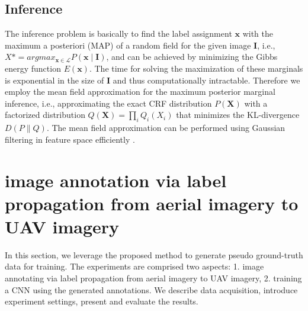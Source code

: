 \subsection{Inference}
\label{method:infer}
The inference problem is basically to find the label assignment $\mathbf{x}$ with the maximum a posteriori (MAP) of a random field for the given image $\mathbf{I}$, i.e., $X\ast = argmax_{\mathbf{x}\in\mathcal{L}}P(\mathbf{x}\mid \mathbf{I})$, and can be achieved by minimizing the Gibbs energy function $E\left(\mathbf{x}\right)$. The time for solving the maximization of these marginals is exponential in the size of $\mathbf{I}$ and thus computationally intractable. Therefore we employ the mean field approximation for the maximum posterior marginal inference, i.e., approximating the exact CRF distribution $P(\mathbf{X})$ with a factorized distribution $Q(\mathbf{X}) = \prod_{i}Q_i(X_i)$ that minimizes the KL-divergence $D(P\|Q)$. The mean field approximation can be performed using Gaussian filtering in feature space efficiently \cite{crf2012}.



\section{image annotation via label propagation from aerial imagery to UAV imagery}
\label{sec:experiment1}
In this section, we leverage the proposed method to generate pseudo ground-truth data for training. The experiments are comprised two aspects: 1. image annotating via label propagation from aerial imagery to UAV imagery, 2. training a CNN using the generated annotations. We describe data acquisition, introduce experiment settings, present and evaluate the results. 


